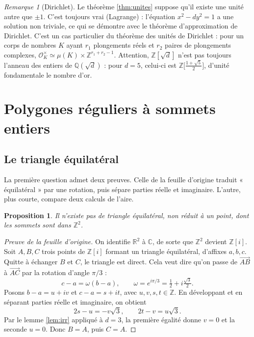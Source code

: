 \documentclass[11pt,a4paper]{article}
\theoremstyle{plain}
\newtheorem{proposition}[theoreme]{Proposition}
\theoremstyle{definition}
\theoremstyle{remark}
\newtheorem{remarque}[theoreme]{Remarque}
\newcommand{\Z}{\mathbb{Z}}
\newcommand{\Q}{\mathbb{Q}}
\newcommand{\R}{\mathbb{R}}
\newcommand{\C}{\mathbb{C}}
\begin{document}
\begin{remarque}[Dirichlet]
Le théorème \ref{thm:unites} suppose qu'il existe une unité autre que $\pm1$. C'est toujours vrai (Lagrange) : l'équation $x^2-dy^2=1$ a une solution non triviale, ce qui se démontre avec le théorème d'approximation de Dirichlet. C'est un cas particulier du théorème des unités de Dirichlet : pour un corps de nombres $K$ ayant $r_1$ plongements réels et $r_2$ paires de plongements complexes, $\mathcal O_K^\times\simeq\mu(K)\times\Z^{r_1+r_2-1}$. Attention, $\Z[\sqrt d]$ n'est pas toujours l'anneau des entiers de $\Q(\sqrt d)$ : pour $d=5$, celui-ci est $\Z\big[\frac{1+\sqrt5}2\big]$, d'unité fondamentale le nombre d'or.
\end{remarque}

\section{Polygones réguliers à sommets entiers}\label{sec:polygones}

\subsection{Le triangle équilatéral}

La première question admet deux preuves. Celle de la feuille d'origine traduit « équilatéral » par une rotation, puis sépare parties réelle et imaginaire. L'autre, plus courte, compare deux calculs de l'aire.

\begin{proposition}\label{prop:triangle}
Il n'existe pas de triangle équilatéral, non réduit à un point, dont les sommets sont dans $\Z^2$.
\end{proposition}

\begin{proof}[Preuve de la feuille d'origine]
On identifie $\R^2$ à $\C$, de sorte que $\Z^2$ devient $\Z[i]$. Soit $A,B,C$ trois points de $\Z[i]$ formant un triangle équilatéral, d'affixes $a,b,c$. Quitte à échanger $B$ et $C$, le triangle est direct. Cela veut dire qu'on passe de $\overrightarrow{AB}$ à $\overrightarrow{AC}$ par la rotation d'angle $\pi/3$ :
\[
  c-a=\omega(b-a),\qquad\omega=e^{i\pi/3}=\tfrac12+i\tfrac{\sqrt3}2 .
\]
Posons $b-a=u+iv$ et $c-a=s+it$, avec $u,v,s,t\in\Z$. En développant et en séparant parties réelle et imaginaire, on obtient
\[
  2s-u=-v\sqrt3,\qquad 2t-v=u\sqrt3 .
\]
Par le lemme \ref{lem:irr} appliqué à $d=3$, la première égalité donne $v=0$ et la seconde $u=0$. Donc $B=A$, puis $C=A$.
\end{proof}
\end{document}
